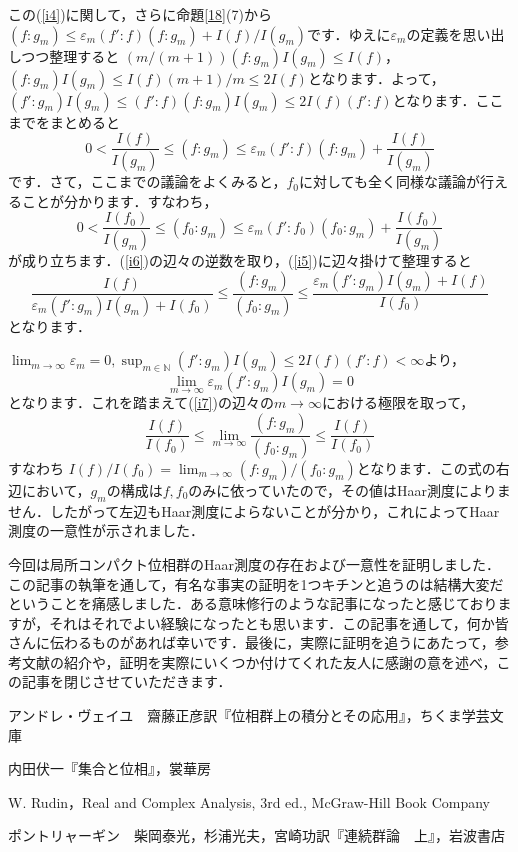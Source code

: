 \begin{Proof}
この(\ref{i4})に関して，さらに命題\ref{18}(7)から$\left( f : g_{m} \right) \le \varepsilon_{m} \left( f' : f \right) \left( f : g_{m} \right) + I(f)/I(g_{m})$です．ゆえに$\varepsilon_{m}$の定義を思い出しつつ整理すると $\left( m/(m+1) \right) \left( f : g_{m} \right)I(g_{m}) \le I(f)$，$\left( f : g_{m} \right)I(g_{m}) \le I(f)(m+1)/m \le 2I(f)$となります．よって，$ \left( f' : g_{m} \right)I(g_{m}) \le 
\left( f' : f \right) \left( f : g_{m} \right) I(g_{m}) \le 2I(f)\left( f' : f \right)$となります．ここまでをまとめると
\begin{equation}
0<\frac{I(f)}{I(g_{m})} \le \left( f : g_{m} \right) \le \varepsilon_{m} \left( f' : f \right) \left( f : g_{m} \right) + \frac{I(f)}{I(g_{m})}
\label{i5}
\end{equation}
です．さて，ここまでの議論をよくみると，$f_0$に対しても全く同様な議論が行えることが分かります．すなわち，
\begin{equation}
0<\frac{I(f_0)}{I(g_{m})} \le \left( f_0 : g_{m} \right) \le \varepsilon_{m} \left( f' : f_0 \right) \left( f_0 : g_{m} \right) +\frac{I(f_0)}{I(g_{m})}
\label{i6}
\end{equation}
が成り立ちます．(\ref{i6})の辺々の逆数を取り，(\ref{i5})に辺々掛けて整理すると
\begin{equation}
\frac{I(f)}{\varepsilon_{m} \left( f' : g_{m} \right)I(g_{m}) + I(f_0)} \le \frac{(f : g_{m}) }{(f_0 : g_{m})} \le \frac{ \varepsilon_{m} \left( f' : g_{m} \right)I(g_{m}) + I(f) }{I(f_0)}
\label{i7}
\end{equation}
となります．

$\lim_{m \to \infty}\varepsilon_{m} =0, \sup_{m \in \mathbb{N}}\left( f' : g_{m} \right)I(g_{m}) \le 2I(f)\left( f' : f \right) < \infty$より，
\[
\lim_{m \to \infty}\varepsilon_{m} \left( f' : g_{m} \right)I(g_{m})=0
\]
となります．これを踏まえて(\ref{i7})の辺々の$m \to \infty$における極限を取って，
\[
\frac{I(f)}{I(f_{0})} \le \lim_{m \to \infty} \frac{\left(f : g_{m} \right)}{\left( f_{0} : g_{m} \right)} \le \frac{I(f)}{I(f_{0})}
\]
すなわち $I(f)/I(f_{0})=\lim_{m \to \infty} \left( f : g_{m} \right) / \left( f_{0} : g_{m} \right)$となります．この式の右辺において，$g_{m}$の構成は$f, f_{0}$のみに依っていたので，その値はHaar測度によりません．したがって左辺もHaar測度によらないことが分かり，これによってHaar測度の一意性が示されました．　
\end{Proof}

今回は局所コンパクト位相群のHaar測度の存在および一意性を証明しました．この記事の執筆を通して，有名な事実の証明を1つキチンと追うのは結構大変だということを痛感しました．ある意味修行のような記事になったと感じておりますが，それはそれでよい経験になったとも思います．この記事を通して，何か皆さんに伝わるものがあれば幸いです．最後に，実際に証明を追うにあたって，参考文献の紹介や，証明を実際にいくつか付けてくれた友人に感謝の意を述べ，この記事を閉じさせていただきます．

\begin{thebibliography}{9}
\item アンドレ・ヴェイユ　齋藤正彦訳『位相群上の積分とその応用』，ちくま学芸文庫
\item 内田伏一『集合と位相』，裳華房
\item W. Rudin，Real and Complex Analysis, 3rd ed., McGraw-Hill Book Company
\item ポントリャーギン　柴岡泰光，杉浦光夫，宮崎功訳『連続群論　上』，岩波書店
\end{thebibliography}
